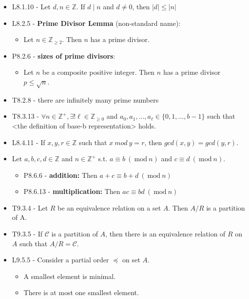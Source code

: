 \documentclass[10pt, landscape]{article}
\renewcommand{\bf}[1]{\textbf{#1}}
\newcommand{\Mod}[1]{\ \mathrm{mod}\ #1}
\begin{document}
\begin{multicols*}{3}
\begin{itemize}
        \item L8.1.10 - Let $d, n \in \mathbb{Z}$. If $d \mid n$ and $d \neq 0$, then $\vert d \vert \leq \vert n \vert$ 
        \item L8.2.5 - \bf{Prime Divisor Lemma} (non-standard name):
        \begin{itemize}
            \item Let $n \in \mathbb{Z}_{\geq 2}$. Then $n$ has a prime divisor.
        \end{itemize}
        \item P8.2.6 - \bf{sizes of prime divisors}: 
        \begin{itemize}
            \item Let $n$ be a composite positive integer. Then $n$ has a prime divisor $p \leq \sqrt{n}$.
        \end{itemize}
        \item T8.2.8 - there are infinitely many prime numbers
        \item T8.3.13 - $\forall n \in \mathbb{Z}^+, \exists ! \ell \in \mathbb{Z}_{\geq 0}$ and $a_0, a_1, \dots, a_\ell \in \{0, 1, \dots, b - 1\}$ 
        such that <the definition of base-b representation> holds.
        \item L8.4.11 - If $x, y, r \in \mathbb{Z}$ such that $x \ mod \ y = r$, then $gcd(x, y) = gcd(y, r)$.
        \item Let $a, b, c, d \in \mathbb{Z}$ and $n \in \mathbb{Z}^+$ s.t. $a \equiv b \ (\Mod{n})$ and $c \equiv d \ (\Mod{n})$. 
        \begin{itemize}
            \item P8.6.6 - \bf{addition: } Then $a + c \equiv b + d \ (\Mod n)$
            \item P8.6.13 - \bf{multiplication: } Then $ac \equiv bd \ (\Mod n)$
        \end{itemize}
        \item T9.3.4 - Let $R$ be an equivalence relation on a set $A$. Then $A / R$ is a partition of A.
        \item T9.3.5 - If $\mathscr{C}$ is a partition of $A$, then there is an equivalence relation of $R$ on $A$ such that $A/R = \mathscr{C}$.
        \item L9.5.5 - Consider a partial order $\preccurlyeq$ on set $A$. 
        \begin{itemize}
            \item A smallest element is minimal.
            \item There is at most one smallest element.

\end{itemize}
\end{itemize}
\end{multicols*}
\end{document}
